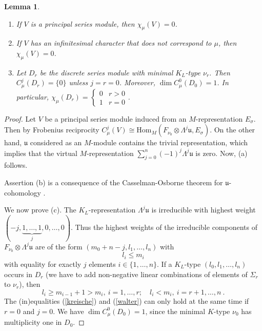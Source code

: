 \documentclass[10]{amsart}
\newtheorem{lem}[thm]{Lemma}
\theoremstyle{remark}
\theoremstyle{definition}
\numberwithin{equation}{section}
\newcommand{\Hom}{\mathrm{Hom}}
\newcommand{\ind}{{\chi}}
\newcommand{\fu}{{\mathfrak u}}
\newcommand{\be}{\begin{equation}}
\begin{document}
{\begin{lem}\label{hansi}
\begin{enumerate}
\item[(a)]
If $V$ is a principal series module, then $\ind_\mu(V)=0$.
\item[(b)]
If $V$ has an infinitesimal character that does not correspond to $\mu$, then $\ind_\mu(V)=0$.
\item[(c)]
Let $D_r$ be the discrete series module with %
minimal $K_L$-type $\nu_r$. Then $C^j_\mu(D_r)=\{0\}$ unless $j=r=0$. Moreover,
$\dim C^0_\mu(D_0)=1$. In particular,  $\ind_\mu(D_r)=\left\{\begin{array}{cc} 0&r>0\\1&r=0\end{array} \right.$.
\end{enumerate}
\end{lem}

\begin{proof}
Let $V$ be a principal series module induced from an $M$-representation $E_\sigma$. Then by Frobenius reciprocity $C^j_\mu(V)\cong\Hom_{M}(F_{\nu_0}\otimes \Lambda^j\fu, E_\sigma)$. On the other hand, $\fu$ considered as an $M$-module contains the trivial representation, which implies that the virtual $M$-representation $\sum_{j=0}^{n}(-1)^j \Lambda^j\fu$ is zero. Now, (a) follows.

Assertion (b) is a consequence of the Casselman-Osborne theorem for $\fu$-cohomology \cite{CasO75}.

We now prove (c). The $K_L$-representation $\Lambda^j\fu$ is irreducible with highest weight  $(-j,\underbrace{1,\dots,1}_j,0,\dots,0)$. Thus the highest weights of the irreducible 
components of $F_{\nu_0}\otimes \Lambda^j\fu$ are of the form $(m_0+n-j, l_1,\dots,l_n)$ with
\be\label{kreische}
l_i\le m_i
\end{equation}
with equality for exactly $j$ elements $i\in\{1,\dots,n\}$. If a $K_L$-type $(l_0,l_1,\dots, l_n)$ occurs in $D_r$ (we have to add non-negative linear combinations of elements of $\Sigma_r$
to $\nu_r$), then
\be\label{walter}
l_i\ge m_{i-1}+1>m_i,\ i=1,\dots, r;\quad l_i<m_i,\ i=r+1,\dots,n\ .
\end{equation}
The (in)equalities (\ref{kreische}) and (\ref{walter}) can only hold at the same time if $r=0$ and $j=0$. We have $\dim C^0_\mu(D_0)=1$, since the minimal $K$-type $\nu_0$
has multiplicity one in $D_0$.
\end{proof}

}
\end{document}
